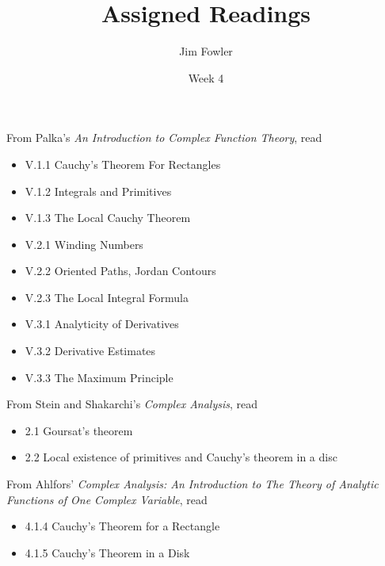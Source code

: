 \documentclass{homework}
\author{Jim Fowler}
\title{Assigned Readings}
\date{Week 4}
\begin{document}
\maketitle


From Palka's \textit{An Introduction to Complex Function Theory}, read
\begin{itemize}
\item V.1.1 Cauchy's Theorem For Rectangles
\item V.1.2 Integrals and Primitives
\item V.1.3 The Local Cauchy Theorem
\item V.2.1 Winding Numbers
\item V.2.2 Oriented Paths, Jordan Contours
\item V.2.3 The Local Integral Formula
\item V.3.1 Analyticity of Derivatives
\item V.3.2 Derivative Estimates
\item V.3.3 The Maximum Principle
\end{itemize}

From Stein and Shakarchi's \textit{Complex Analysis}, read
\begin{itemize}
\item 2.1 Goursat's theorem
\item 2.2 Local existence of primitives and Cauchy's theorem in a disc
\end{itemize}

From Ahlfors' \textit{Complex Analysis: An Introduction to The Theory of Analytic Functions of One Complex Variable}, read
\begin{itemize}
\item 4.1.4 Cauchy's Theorem for a Rectangle
\item 4.1.5 Cauchy's Theorem in a Disk
\end{itemize}
\end{document}
